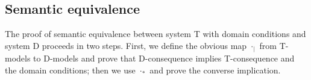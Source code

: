 \documentclass{article}
\newtheorem{proposition}[definition]{Proposition}
\newcommand{\D}{\textsf D}
\newcommand{\T}{\textsf T}
\newcommand{\starfun}[1]{\ensuremath{{#1}^\ast}}
\newcommand{\modelfun}[1]{\ensuremath{{#1}_\ast}}
\newcommand{\modelmap}{\modelfun\cdot}
\newcommand{\restrfun}[1]{\ensuremath{{#1}_|}}
\newcommand{\restrmap}{\restrfun\cdot}
\newcommand{\ok}{\mbox{\em wf}}
\newcommand{\wf}{\ \mbox{\em wf}}
\newcommand{\myvdash}[1]{\ensuremath{\vdash^{\mathsf{#1}}}}
\newcommand{\synDC}[1][{}]{\ifthenelse{\equal{#1}{}}{%
{\ensuremath{{\cal{DC}}}}}{%
{\ensuremath{{\cal{DC}}_{#1}}}}}
\begin{document}




\subsection{Semantic equivalence}

The proof of semantic equivalence between system {\T} with domain
conditions and system {\D} proceeds in two steps.  First, we define
the obvious map {\restrmap} from {\T}-models to {\D}-models and prove
that {\D}-consequence implies {\T}-consequence and the domain
conditions; then we use {\modelmap} and prove the converse implication.
\end{document}
